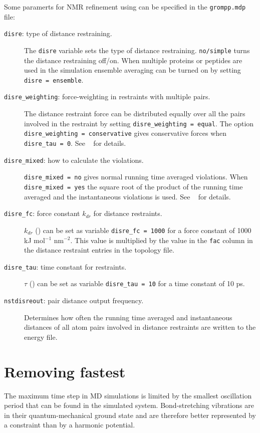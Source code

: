 Some paramerts for NMR refinement using can be specified in the
{\tt grompp.mdp} file:
\begin{description}
\item[{\tt disre}: type of distance restraining.]
	The {\tt disre} variable sets the type of distance restraining.
	{\tt no/simple} turns the distance restraining off/on.
 	When multiple proteins or peptides are used
	in the simulation ensemble averaging 
	can be turned on by setting {\tt disre = ensemble}.
\item[{\tt disre\_weighting}: force-weighting in restraints with
	 multiple pairs.]
	The distance restraint force can be distributed equally
	over all the pairs involved in the restraint by setting
	{\tt disre\_weighting = equal}.
	The option {\tt disre\_weighting = conservative}
	gives conservative forces when {\tt disre\_tau = 0}.
	See ~ for details.
\item[{\tt disre\_mixed}: how to calculate the violations.]
	{\tt disre\_mixed = no} gives normal running time
	averaged violations.
	When {\tt disre\_mixed = yes} the square root of the
	product of the running time averaged and the instantaneous
	violations is used.
	See ~ for details.
\item[{\tt disre\_fc}: force constant $k_{dr}$ for distance restraints.] 
	$k_{dr}$  () can be set
	as variable {\tt disre\_fc = 1000} for a force constant of
	1000 {kJ mol$^{-1}$ nm$^{-2}$}. This value is multiplied by
	the value in the {\tt fac} column in the distance restraint
	entries in the topology file.
\item[{\tt disre\_tau}: time constant for restraints.] 
	$\tau$ () can be set
	as variable {\tt disre\_tau = 10} for a time constant of
	10 ps.
\item[{\tt nstdisreout}: pair distance output frequency.]
	Determines how often the running time averaged and 
	instantaneous distances of all atom pairs involved in
	distance restraints are written to the energy file.
\end{description}

\newcommand{\amine}{\sf -NH$_2$}
\newcommand{\amines}{\sf -NH-}
\newcommand{\aminep}{\sf -NH$_3^+$}
\section{Removing fastest }
The maximum time step in MD simulations is limited by the smallest
oscillation period that can be found in the simulated
system. Bond-stretching vibrations are in their quantum-mechanical
ground state and are therefore better represented by a constraint than
by a harmonic potential.

